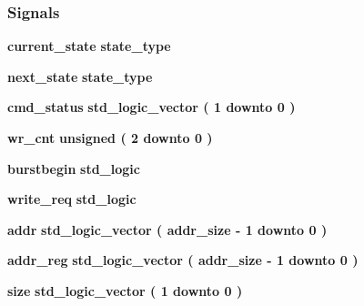 \subsubsection*{Signals}
 \begin{DoxyCompactItemize}
\item 
{\bf current\+\_\+state} {\bfseries {\bfseries {\bf state\+\_\+type}} \textcolor{vhdlchar}{ }} 
\item 
{\bf next\+\_\+state} {\bfseries {\bfseries {\bf state\+\_\+type}} \textcolor{vhdlchar}{ }} 
\item 
{\bf cmd\+\_\+status} {\bfseries \textcolor{comment}{std\+\_\+logic\+\_\+vector}\textcolor{vhdlchar}{ }\textcolor{vhdlchar}{(}\textcolor{vhdlchar}{ }\textcolor{vhdlchar}{ } \textcolor{vhdldigit}{1} \textcolor{vhdlchar}{ }\textcolor{keywordflow}{downto}\textcolor{vhdlchar}{ }\textcolor{vhdlchar}{ } \textcolor{vhdldigit}{0} \textcolor{vhdlchar}{ }\textcolor{vhdlchar}{)}\textcolor{vhdlchar}{ }} 
\item 
{\bf wr\+\_\+cnt} {\bfseries \textcolor{comment}{unsigned}\textcolor{vhdlchar}{ }\textcolor{vhdlchar}{(}\textcolor{vhdlchar}{ }\textcolor{vhdlchar}{ } \textcolor{vhdldigit}{2} \textcolor{vhdlchar}{ }\textcolor{keywordflow}{downto}\textcolor{vhdlchar}{ }\textcolor{vhdlchar}{ } \textcolor{vhdldigit}{0} \textcolor{vhdlchar}{ }\textcolor{vhdlchar}{)}\textcolor{vhdlchar}{ }} 
\item 
{\bf burstbegin} {\bfseries \textcolor{comment}{std\+\_\+logic}\textcolor{vhdlchar}{ }} 
\item 
{\bf write\+\_\+req} {\bfseries \textcolor{comment}{std\+\_\+logic}\textcolor{vhdlchar}{ }} 
\item 
{\bf addr} {\bfseries \textcolor{comment}{std\+\_\+logic\+\_\+vector}\textcolor{vhdlchar}{ }\textcolor{vhdlchar}{(}\textcolor{vhdlchar}{ }\textcolor{vhdlchar}{ }\textcolor{vhdlchar}{ }\textcolor{vhdlchar}{ }{\bfseries {\bf addr\+\_\+size}} \textcolor{vhdlchar}{-\/}\textcolor{vhdlchar}{ } \textcolor{vhdldigit}{1} \textcolor{vhdlchar}{ }\textcolor{keywordflow}{downto}\textcolor{vhdlchar}{ }\textcolor{vhdlchar}{ } \textcolor{vhdldigit}{0} \textcolor{vhdlchar}{ }\textcolor{vhdlchar}{)}\textcolor{vhdlchar}{ }} 
\item 
{\bf addr\+\_\+reg} {\bfseries \textcolor{comment}{std\+\_\+logic\+\_\+vector}\textcolor{vhdlchar}{ }\textcolor{vhdlchar}{(}\textcolor{vhdlchar}{ }\textcolor{vhdlchar}{ }\textcolor{vhdlchar}{ }\textcolor{vhdlchar}{ }{\bfseries {\bf addr\+\_\+size}} \textcolor{vhdlchar}{-\/}\textcolor{vhdlchar}{ } \textcolor{vhdldigit}{1} \textcolor{vhdlchar}{ }\textcolor{keywordflow}{downto}\textcolor{vhdlchar}{ }\textcolor{vhdlchar}{ } \textcolor{vhdldigit}{0} \textcolor{vhdlchar}{ }\textcolor{vhdlchar}{)}\textcolor{vhdlchar}{ }} 
\item 
{\bf size} {\bfseries \textcolor{comment}{std\+\_\+logic\+\_\+vector}\textcolor{vhdlchar}{ }\textcolor{vhdlchar}{(}\textcolor{vhdlchar}{ }\textcolor{vhdlchar}{ } \textcolor{vhdldigit}{1} \textcolor{vhdlchar}{ }\textcolor{keywordflow}{downto}\textcolor{vhdlchar}{ }\textcolor{vhdlchar}{ } \textcolor{vhdldigit}{0} \textcolor{vhdlchar}{ }\textcolor{vhdlchar}{)}\textcolor{vhdlchar}{ }} 
\end{DoxyCompactItemize}


